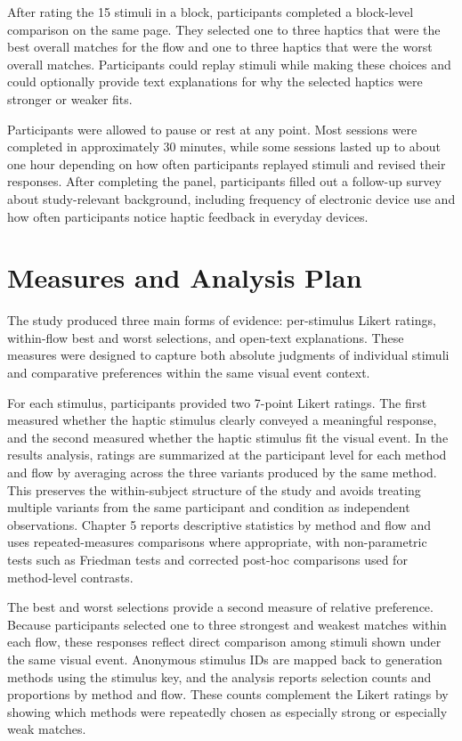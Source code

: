 After rating the 15 stimuli in a block, participants completed a block-level comparison on the same page. They selected one to three haptics that were the best overall matches for the flow and one to three haptics that were the worst overall matches. Participants could replay stimuli while making these choices and could optionally provide text explanations for why the selected haptics were stronger or weaker fits.

Participants were allowed to pause or rest at any point. Most sessions were completed in approximately 30 minutes, while some sessions lasted up to about one hour depending on how often participants replayed stimuli and revised their responses. After completing the panel, participants filled out a follow-up survey about study-relevant background, including frequency of electronic device use and how often participants notice haptic feedback in everyday devices.

\section{Measures and Analysis Plan}

The study produced three main forms of evidence: per-stimulus Likert ratings, within-flow best and worst selections, and open-text explanations. These measures were designed to capture both absolute judgments of individual stimuli and comparative preferences within the same visual event context.

For each stimulus, participants provided two 7-point Likert ratings. The first measured whether the haptic stimulus clearly conveyed a meaningful response, and the second measured whether the haptic stimulus fit the visual event. In the results analysis, ratings are summarized at the participant level for each method and flow by averaging across the three variants produced by the same method. This preserves the within-subject structure of the study and avoids treating multiple variants from the same participant and condition as independent observations. Chapter 5 reports descriptive statistics by method and flow and uses repeated-measures comparisons where appropriate, with non-parametric tests such as Friedman tests and corrected post-hoc comparisons used for method-level contrasts.

The best and worst selections provide a second measure of relative preference. Because participants selected one to three strongest and weakest matches within each flow, these responses reflect direct comparison among stimuli shown under the same visual event. Anonymous stimulus IDs are mapped back to generation methods using the stimulus key, and the analysis reports selection counts and proportions by method and flow. These counts complement the Likert ratings by showing which methods were repeatedly chosen as especially strong or especially weak matches.

